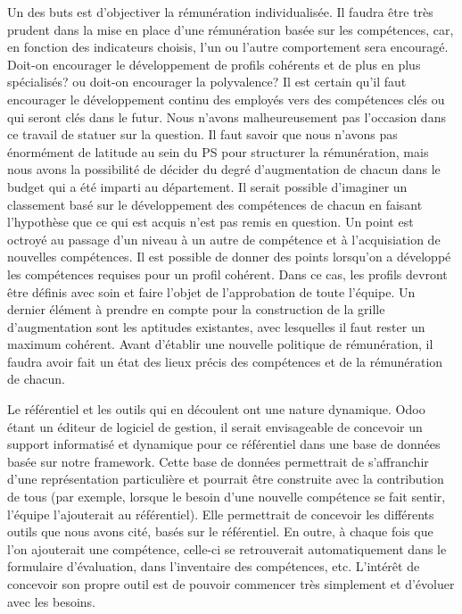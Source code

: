 \begin{description}
    Un des buts est d'objectiver la rémunération individualisée. Il faudra être très prudent dans la mise en place d'une rémunération basée sur les compétences, car, en fonction des indicateurs choisis, l'un ou l'autre comportement sera encouragé. Doit-on encourager le développement de profils cohérents et de plus en plus spécialisés? ou doit-on encourager la polyvalence? Il est certain qu'il faut encourager le développement continu des employés vers des compétences clés ou qui seront clés dans le futur. Nous n'avons malheureusement pas l'occasion dans ce travail de statuer sur la question. Il faut savoir que nous n'avons pas énormément de latitude au sein du PS pour structurer la rémunération, mais nous avons la possibilité de décider du degré d'augmentation de chacun dans le budget qui a été imparti au département. Il serait possible d'imaginer un classement basé sur le développement des compétences de chacun en faisant l'hypothèse que ce qui est acquis n'est pas remis en question. Un point est octroyé au passage d'un niveau à un autre de compétence et à l'acquisiation de nouvelles compétences. Il est possible de donner des points lorsqu'on a développé les compétences requises pour un profil cohérent. Dans ce cas, les profils devront être définis avec soin et faire l'objet de l'approbation de toute l'équipe. Un dernier élément à prendre en compte pour la construction de la grille d'augmentation sont les aptitudes existantes, avec lesquelles il faut rester un maximum cohérent. Avant d'établir une nouvelle politique de rémunération, il faudra avoir fait un état des lieux précis des compétences et de la rémunération de chacun.
    
    \end{description}
    
    Le référentiel et les outils qui en découlent ont une nature dynamique. Odoo étant un éditeur de logiciel de gestion, il serait envisageable de concevoir un support informatisé et dynamique pour ce référentiel dans une base de données basée sur notre framework. Cette base de données permettrait de s'affranchir d'une représentation particulière et pourrait être construite avec la contribution de tous (par exemple, lorsque le besoin d'une nouvelle compétence se fait sentir, l'équipe l'ajouterait au référentiel). Elle permettrait de concevoir les différents outils que nous avons cité, basés sur le référentiel. En outre, à chaque fois que l'on ajouterait une compétence, celle-ci se retrouverait automatiquement dans le formulaire d'évaluation, dans l'inventaire des compétences, etc. L'intérêt de concevoir son propre outil est de pouvoir commencer très simplement et d'évoluer avec les besoins. 



